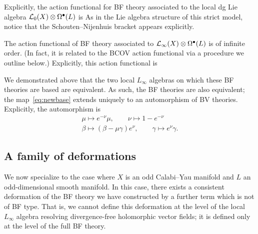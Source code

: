 \documentclass[11pt]{amsart}
\begin{document}
Explicitly, the action functional for BF theory associated to the local dg Lie algebra $\mathcal L_0(X) \otimes \Omega^{\bullet}(L)$ is
As in the Lie algebra structure of this strict model, notice that the Schouten--Nijenhuis bracket appears explicitly. 

The action functional of BF theory associated to $\mathcal L_\infty(X) \otimes \Omega^{\bullet}(L)$ is of infinite order. 
(In fact, it is related to the BCOV action functional via a procedure we outline below.) 
Explicitly, this action functional is

We demonstrated above that the two local $L_\infty$ algebras on which these BF theories are based are equivalent. As such, the BF theories are also equivalent; the map~\eqref{eq:newbase} extends uniquely to an automorphism of BV theories.
Explicitly, the automorphism is
\begin{multline}
  \mu \mapsto e^{-\nu} \mu, \qquad \nu \mapsto 1-e^{-\nu} \\
  \beta \mapsto (\beta - \mu \gamma) e^{\nu},\qquad \gamma \mapsto e^{\nu} \gamma .
\end{multline}
\subsection{A family of deformations} 

\parsec
We now specialize to the case where $X$ is an odd Calabi--Yau manifold and $L$ an odd-dimensional smooth manifold. 
In this case, there exists a consistent deformation of the BF theory we have constructed by a further term which is not of BF type. That is, we cannot define this deformation at the level of the local $L_\infty$ algebra resolving divergence-free holomorphic vector fields; it is defined only at the level of the full BF theory.
\end{document}
